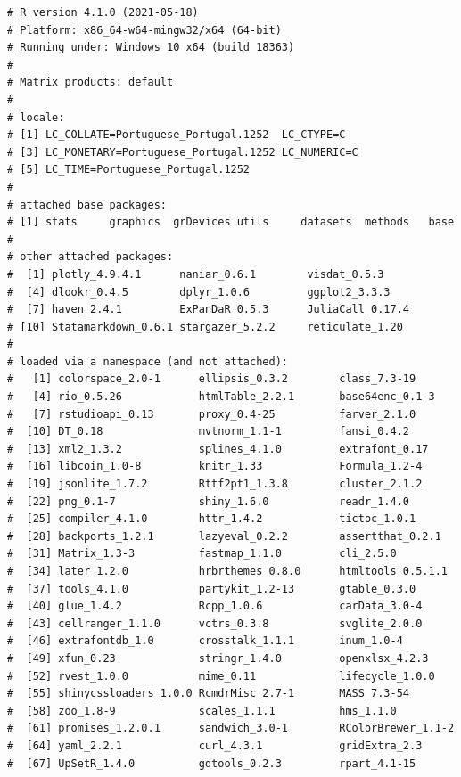 \documentclass[
  12pt,
]{article}
\begin{document}
\begin{verbatim}
# R version 4.1.0 (2021-05-18) 
# Platform: x86_64-w64-mingw32/x64 (64-bit) 
# Running under: Windows 10 x64 (build 18363) 
#  
# Matrix products: default 
#  
# locale: 
# [1] LC_COLLATE=Portuguese_Portugal.1252  LC_CTYPE=C                           
# [3] LC_MONETARY=Portuguese_Portugal.1252 LC_NUMERIC=C                         
# [5] LC_TIME=Portuguese_Portugal.1252     
#  
# attached base packages: 
# [1] stats     graphics  grDevices utils     datasets  methods   base      
#  
# other attached packages: 
#  [1] plotly_4.9.4.1      naniar_0.6.1        visdat_0.5.3        
#  [4] dlookr_0.4.5        dplyr_1.0.6         ggplot2_3.3.3       
#  [7] haven_2.4.1         ExPanDaR_0.5.3      JuliaCall_0.17.4    
# [10] Statamarkdown_0.6.1 stargazer_5.2.2     reticulate_1.20     
#  
# loaded via a namespace (and not attached): 
#   [1] colorspace_2.0-1      ellipsis_0.3.2        class_7.3-19          
#   [4] rio_0.5.26            htmlTable_2.2.1       base64enc_0.1-3       
#   [7] rstudioapi_0.13       proxy_0.4-25          farver_2.1.0          
#  [10] DT_0.18               mvtnorm_1.1-1         fansi_0.4.2           
#  [13] xml2_1.3.2            splines_4.1.0         extrafont_0.17        
#  [16] libcoin_1.0-8         knitr_1.33            Formula_1.2-4         
#  [19] jsonlite_1.7.2        Rttf2pt1_1.3.8        cluster_2.1.2         
#  [22] png_0.1-7             shiny_1.6.0           readr_1.4.0           
#  [25] compiler_4.1.0        httr_1.4.2            tictoc_1.0.1          
#  [28] backports_1.2.1       lazyeval_0.2.2        assertthat_0.2.1      
#  [31] Matrix_1.3-3          fastmap_1.1.0         cli_2.5.0             
#  [34] later_1.2.0           hrbrthemes_0.8.0      htmltools_0.5.1.1     
#  [37] tools_4.1.0           partykit_1.2-13       gtable_0.3.0          
#  [40] glue_1.4.2            Rcpp_1.0.6            carData_3.0-4         
#  [43] cellranger_1.1.0      vctrs_0.3.8           svglite_2.0.0         
#  [46] extrafontdb_1.0       crosstalk_1.1.1       inum_1.0-4            
#  [49] xfun_0.23             stringr_1.4.0         openxlsx_4.2.3        
#  [52] rvest_1.0.0           mime_0.11             lifecycle_1.0.0       
#  [55] shinycssloaders_1.0.0 RcmdrMisc_2.7-1       MASS_7.3-54           
#  [58] zoo_1.8-9             scales_1.1.1          hms_1.1.0             
#  [61] promises_1.2.0.1      sandwich_3.0-1        RColorBrewer_1.1-2    
#  [64] yaml_2.2.1            curl_4.3.1            gridExtra_2.3         
#  [67] UpSetR_1.4.0          gdtools_0.2.3         rpart_4.1-15          

\end{verbatim}
\end{document}
